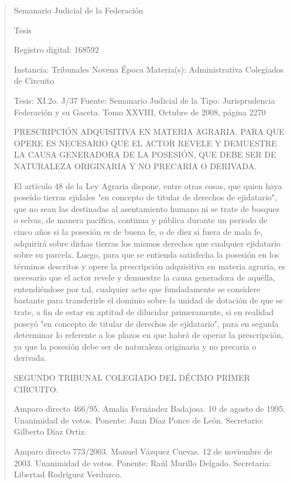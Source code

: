 \documentclass[11pt,a4paper]{article}
\begin{document}
\begin{quote}
                                                   Semanario Judicial de la Federación

                                                  Tesis

 Registro digital: 168592

 Instancia: Tribunales            Novena Época                         Materia(s): Administrativa
 Colegiados de Circuito

 Tesis: XI.2o. J/37               Fuente: Semanario Judicial de la     Tipo: Jurisprudencia
                                  Federación y su Gaceta.
                                  Tomo XXVIII, Octubre de 2008,
                                  página 2270


PRESCRIPCIÓN ADQUISITIVA EN MATERIA AGRARIA. PARA QUE OPERE ES NECESARIO
QUE EL ACTOR REVELE Y DEMUESTRE LA CAUSA GENERADORA DE LA POSESIÓN, QUE
DEBE SER DE NATURALEZA ORIGINARIA Y NO PRECARIA O DERIVADA.


El artículo 48 de la Ley Agraria dispone, entre otras cosas, que quien haya poseído tierras ejidales
"en concepto de titular de derechos de ejidatario", que no sean las destinadas al asentamiento
humano ni se trate de bosques o selvas, de manera pacífica, continua y pública durante un periodo
de cinco años si la posesión es de buena fe, o de diez si fuera de mala fe, adquirirá sobre dichas
tierras los mismos derechos que cualquier ejidatario sobre su parcela. Luego, para que se entienda
satisfecha la posesión en los términos descritos y opere la prescripción adquisitiva en materia
agraria, es necesario que el actor revele y demuestre la causa generadora de aquélla,
entendiéndose por tal, cualquier acto que fundadamente se considere bastante para transferirle el
dominio sobre la unidad de dotación de que se trate, a fin de estar en aptitud de dilucidar
primeramente, si en realidad poseyó "en concepto de titular de derechos de ejidatario", para en
seguida determinar lo referente a los plazos en que habrá de operar la prescripción, ya que la
posesión debe ser de naturaleza originaria y no precaria o derivada.

SEGUNDO TRIBUNAL COLEGIADO DEL DÉCIMO PRIMER CIRCUITO.


Amparo directo 466/95. Amalia Fernández Badajosa. 10 de agosto de 1995. Unanimidad de votos.
Ponente: Juan Díaz Ponce de León. Secretario: Gilberto Díaz Ortiz.

Amparo directo 773/2003. Manuel Vázquez Cuevas. 12 de noviembre de 2003. Unanimidad de
votos. Ponente: Raúl Murillo Delgado. Secretaria: Libertad Rodríguez Verduzco.


\end{quote}
\end{document}

